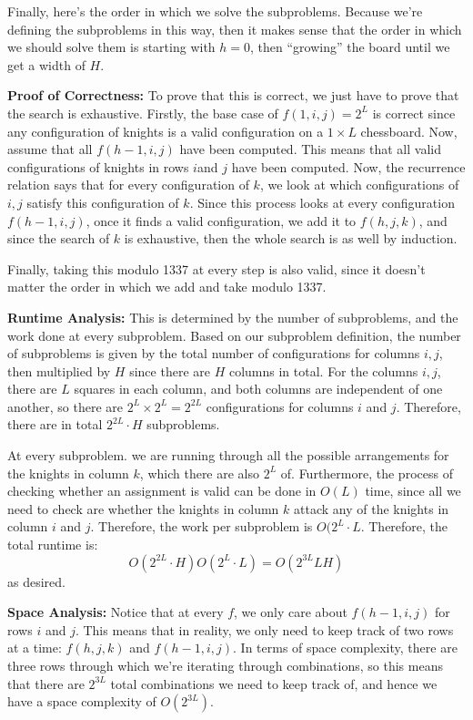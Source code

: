 \documentclass[11pt]{article}
\begin{document}
\begin{solution}
	Finally, here's the order in which we solve the subproblems.   
	Because we're defining the subproblems in this way, then it makes sense that the order in which we should 
	solve them is starting with $h = 0$, then ``growing'' the board until we get a width of $H$.  

	\textbf{Proof of Correctness:} To prove that this is correct, we just have to prove that the search is 
	exhaustive. Firstly, the base case of $f(1, i, j) = 2^L$ is correct since any configuration of knights 
	is a valid configuration on a \(1 \times L\) chessboard. Now, assume that all \(f(h-1, i, j)\) have 
	been computed. This means that all valid configurations of knights in rows \( i\)and \(j\) have been 
	computed. Now, the recurrence relation says that for every configuration of $k$, we look at 
	which configurations of \(i, j\) satisfy this configuration of \(k\). Since this process 
	looks at every configuration \(f(h-1, i, j)\), once it finds a valid configuration, we add it to 
	\(f(h, j, k)\), and since the search of \(k\) is exhaustive, then the whole search is as well by induction.

	Finally, taking this modulo 1337 at every step is also valid, since it doesn't matter the order in which 
	we add and take modulo 1337. 

	\textbf{Runtime Analysis:} This is determined by the number of subproblems, and the work done at every 
	subproblem. Based on our subproblem definition, the number of subproblems is given by the total number 
	of configurations for columns \(i, j\), then multiplied by $H$ since there are $H$ columns in total. For 
	the columns \(i, j\), there are $L$ squares in each column, and both columns are independent of one another, 
	so there are \(2^L \times  2^L = 2^{2L}\) configurations for columns \(i\) and \(j\). Therefore, there are
	in total \(2^{2L} \cdot H\) subproblems.

	At every subproblem. we are running through all the possible arrangements for the knights in column \(k\), 
	which there are also \(2^L\) of. Furthermore, the process of checking whether an assignment is valid can 
	be done in \(O(L)\) time, since all we need to check are whether the knights in column \(k\) attack any of 
	the knights in column \(i\) and \(j\). Therefore, the work per subproblem is \(O(2^{L} \cdot L\). 
	Therefore, the total runtime is:
	\[
		O(2^{2L} \cdot H) O(2^L \cdot L) = O(2^{3L}LH)
	\] 
	as desired. 


	\textbf{Space Analysis:} Notice that at every \(f\), we only care about $f(h-1, i, j)$ for rows \(i\) and 
	\(j\). This means that in reality, we only need to keep track of two rows at a time: $f(h, j, k)$ and 
	\(f(h-1, i, j)\). In terms of space complexity, there are three rows through which we're iterating through 
	combinations, so this means that there are \(2^{3L}\) total combinations we need to keep track of, 
	and hence we have a space complexity of \(O(2^{3L})\).
\end{solution}
\end{document}
